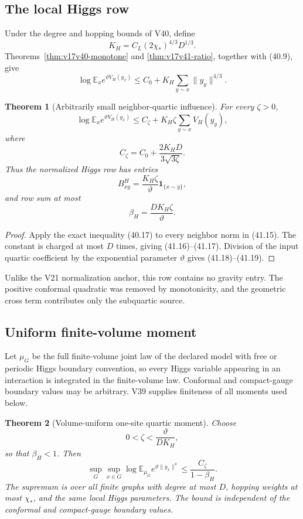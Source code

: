 \documentclass[11pt]{article}
\newtheorem{theorem}{Theorem}[section]
\theoremstyle{remark}
\begin{document}
\subsection{The local Higgs row}

Under the degree and hopping bounds of V40, define
\[
 K_H=C_L(2\chi_*)^{4/3}D^{1/3}.                   \tag{41.14}
\]
Theorems~\ref{thm:v17v40-monotone} and
\ref{thm:v17v41-ratio}, together with (40.9), give
\[
 \log\mathbb E_xe^{\vartheta V_H(y_x)}
 \leq C_0+K_H\sum_{y\sim x}\|y_y\|^{4/3}.       \tag{41.15}
\]

\begin{theorem}[Arbitrarily small neighbor-quartic influence]
\label{thm:v17v41-row}
For every \(\zeta>0\),
\[
 \log\mathbb E_xe^{\vartheta V_H(y_x)}
 \leq C_\zeta+K_H\zeta
 \sum_{y\sim x}V_H(y_y),                          \tag{41.16}
\]
where
\[
 C_\zeta=C_0+
 \frac{2K_HD}{3\sqrt{3\zeta}}.                   \tag{41.17}
\]
Thus the normalized Higgs row has entries
\[
 B_{xy}^{H}=\frac{K_H\zeta}{\vartheta}
 \mathbf1_{\{x\sim y\}},                         \tag{41.18}
\]
and row sum at most
\[
 \beta_H=\frac{DK_H\zeta}{\vartheta}.             \tag{41.19}
\]
\end{theorem}

\begin{proof}
Apply the exact inequality (40.17) to every neighbor norm in (41.15).
The constant is charged at most \(D\) times, giving
(41.16)--(41.17).  Division of the input quartic coefficient by the
exponential parameter \(\vartheta\) gives (41.18)--(41.19).
\end{proof}

Unlike the V21 normalization anchor, this row contains no gravity
entry.  The positive conformal quadratic was removed by monotonicity,
and the geometric cross term contributes only the subquartic source.

\subsection{Uniform finite-volume moment}

Let \(\mu_G\) be the full finite-volume joint law of the declared model
with free or periodic Higgs boundary convention, so every Higgs variable
appearing in an interaction is integrated in the finite-volume law.
Conformal and compact-gauge boundary values may be arbitrary.  V39
supplies finiteness of all moments used below.

\begin{theorem}[Volume-uniform one-site quartic moment]
\label{thm:v17v41-uniform}
Choose
\[
 0<\zeta<\frac{\vartheta}{DK_H},                   \tag{41.20}
\]
so that \(\beta_H<1\).  Then
\[
\boxed{
 \sup_G\sup_{x\in G}
 \log\mathbb E_{\mu_G}
 e^{\vartheta\|y_x\|^4}
 \leq\frac{C_\zeta}{1-\beta_H}.}                 \tag{41.21}
\]
The supremum is over all finite graphs with degree at most \(D\),
hopping weights at most \(\chi_*\), and the same local Higgs parameters.
The bound is independent of the conformal and compact-gauge boundary
values.
\end{theorem}
\end{document}
